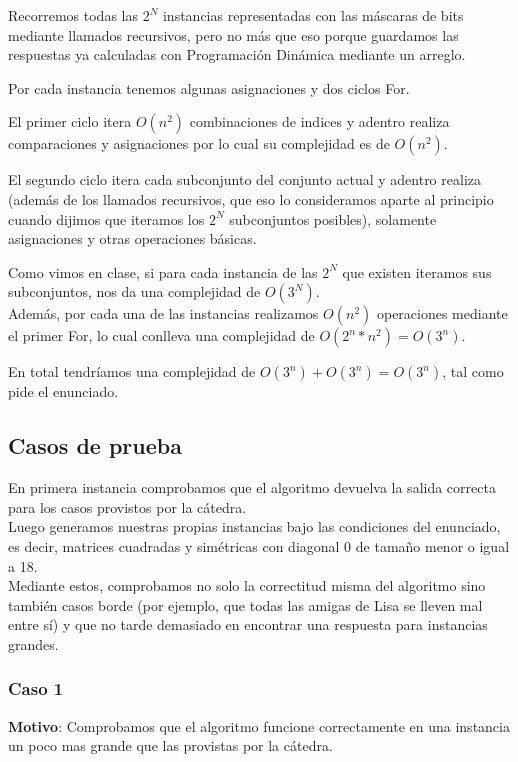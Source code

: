 Recorremos todas las $2^N$ instancias representadas con las máscaras de bits
mediante llamados recursivos, pero no más que eso porque guardamos las
respuestas ya calculadas con Programación Dinámica mediante un arreglo.

Por cada instancia tenemos algunas asignaciones y dos ciclos For.

El primer ciclo itera $O(n^2)$ combinaciones de indices y adentro realiza
comparaciones y asignaciones por lo cual su complejidad es de $O(n^2)$.

El segundo ciclo itera cada subconjunto del conjunto actual y adentro realiza
(además de los llamados recursivos, que eso lo consideramos aparte al principio
cuando dijimos que iteramos los $2^N$ subconjuntos posibles), solamente
asignaciones y otras operaciones básicas.

Como vimos en clase, si para cada instancia de las $2^N$ que existen iteramos
sus subconjuntos, nos da una complejidad de $O(3^N)$.\\ Además, por cada una de
las instancias realizamos $O(n^2)$ operaciones mediante el primer For, lo cual
conlleva una complejidad de $O(2^n * n^2) = O(3^n)$.

En total tendríamos una complejidad de $O(3^n) + O(3^n) = O(3^n)$, tal como pide
el enunciado.

\subsection{Casos de prueba}

En primera instancia comprobamos que el algoritmo devuelva la salida correcta para los casos provistos por la cátedra. \\
Luego generamos nuestras propias instancias bajo las condiciones del enunciado, es decir, matrices cuadradas y simétricas con diagonal 0 de tamaño menor o igual a 18. \\
Mediante estos, comprobamos no solo la correctitud misma del algoritmo sino también casos borde 
(por ejemplo, que todas las amigas de Lisa se lleven mal entre sí) 
y que no tarde demasiado en encontrar una respuesta para instancias grandes.


\subsubsection*{Caso 1}

\textbf{Motivo}: Comprobamos que el algoritmo funcione correctamente en una instancia un poco mas grande que las provistas por la cátedra. \\

